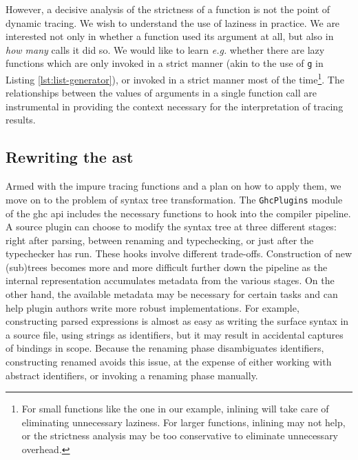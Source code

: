 \documentclass[thesis=B,english]{FITthesis}[2019/12/23]
\newcommand{\eg}{\emph{e.g.}\xspace}
\newcommand{\hsIdent}[1]{\texttt{#1}}
\newcommand{\hsModule}[1]{\texttt{#1}}
\begin{document}
However, a decisive analysis of the strictness of a function is not the point
of dynamic tracing. We wish to understand the use of laziness in practice. We
are interested not only in whether a function used its argument at all, but
also in \textit{how many} calls it did so. We would like to learn \eg whether
there are lazy functions which are only invoked in a strict manner (akin to the
use of \hsIdent{g} in Listing \ref{lst:list-generator}), or invoked in a strict
manner most of the time\footnote{
	For small functions like the one in our example, inlining will take care of
	eliminating unnecessary laziness. For larger functions, inlining may not
	help, or the strictness analysis may be too conservative to eliminate
	unnecessary overhead.
}. The relationships between the values of arguments in a single function call
are instrumental in providing the context necessary for the interpretation of
tracing results.

\subsection*{Rewriting the \acrshort{ast}}
Armed with the impure tracing functions and a plan on how to apply them, we
move on to the problem of syntax tree transformation. The \hsModule{GhcPlugins}
module\cite{hkg-ghcplugins} of the \acrshort{ghc} \acrshort{api} includes the
necessary functions to hook into the compiler pipeline. A source plugin can
choose to modify the syntax tree at three different stages: right after
parsing, between renaming and typechecking, or just after the typechecker has
run. These hooks involve different trade-offs. Construction of new (sub)trees
becomes more and more difficult further down the pipeline as the internal
representation accumulates metadata from the various stages. On the other hand,
the available metadata may be necessary for certain tasks and can help plugin
authors write more robust implementations. For example, constructing parsed
expressions is almost as easy as writing the surface syntax in a source file,
using strings as identifiers, but it may result in accidental captures of
bindings in scope. Because the renaming phase disambiguates identifiers,
constructing renamed  avoids this issue, at the expense of
either working with abstract identifiers, or invoking a renaming phase
manually.
\end{document}

